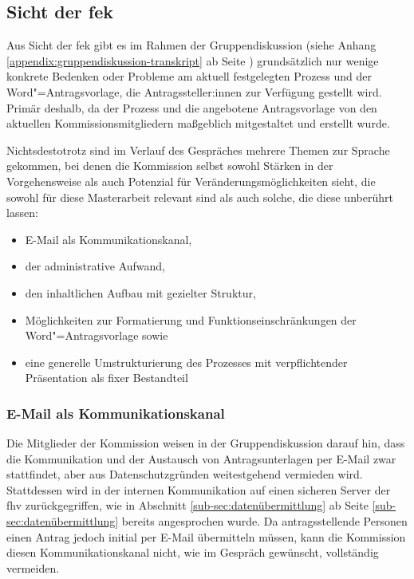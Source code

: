 \documentclass[a4paper,12pt,twoside]{scrreprt}
\begin{document}
\subsection{Sicht der \acl{fek}}
\label{sub-sec:probleme-sicht-fek}

Aus Sicht der \acl{fek} gibt es im Rahmen der Gruppendiskussion (siehe Anhang \ref{appendix:gruppendiskussion-transkript} ab Seite \pageref{appendix:gruppendiskussion-transkript}) grundsätzlich nur wenige konkrete Bedenken oder Probleme am aktuell festgelegten Prozess und der Word"=Antragsvorlage, die Antragssteller:innen zur Verfügung gestellt wird. Primär deshalb, da der Prozess und die angebotene Antragsvorlage von den aktuellen Kommissionsmitgliedern maßgeblich mitgestaltet und erstellt wurde.

Nichtsdestotrotz sind im Verlauf des Gespräches mehrere Themen zur Sprache gekommen, bei denen die Kommission selbst sowohl Stärken in der Vorgehensweise als auch Potenzial für Veränderungsmöglichkeiten sieht, die sowohl für diese Masterarbeit relevant sind als auch solche, die diese unberührt lassen:
\begin{itemize}
    \item E-Mail als Kommunikationskanal,
    \item der administrative Aufwand,
    \item den inhaltlichen Aufbau mit gezielter Struktur,
    \item Möglichkeiten zur Formatierung und Funktionseinschränkungen der Word"=Antragsvorlage sowie
    \item eine generelle Umstrukturierung des Prozesses mit verpflichtender Präsentation als fixer Bestandteil
\end{itemize}

\subsubsection*{E-Mail als Kommunikationskanal}
\label{sub-sub-sec:email-kommunikationskanal}

Die Mitglieder der Kommission weisen in der Gruppendiskussion darauf hin, dass die Kommunikation und der Austausch von Antragsunterlagen per E-Mail zwar stattfindet, aber aus Datenschutzgründen weitestgehend vermieden wird. Stattdessen wird in der internen Kommunikation auf einen sicheren Server der \acl{fhv} zurückgegriffen, wie in Abschnitt \ref{sub-sec:datenübermittlung} ab Seite \ref{sub-sec:datenübermittlung} bereits angesprochen wurde. Da antragsstellende Personen einen Antrag jedoch initial per E-Mail übermitteln müssen, kann die Kommission diesen Kommunikationskanal nicht, wie im Gespräch gewünscht, vollständig vermeiden.
\end{document}
